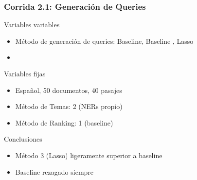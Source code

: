 \begin{frame}
\frametitle{Corrida 2.1: Generación de Queries}

Variables variables
\begin{itemize}
  \item Método de generación de queries: Baseline, Baseline , Lasso
  \item 
\end{itemize}

Variables fijas
\begin{itemize}
  \item Español, 50 documentos, 40 pasajes
  \item Método de Temas: 2 (NERs propio)
  \item Método de Ranking: 1 (baseline)
\end{itemize}

Conclusiones
\begin{itemize}
  \item Método 3 (Lasso) ligeramente superior a baseline
  \item Baseline  rezagado siempre
\end{itemize}


\end{frame}


